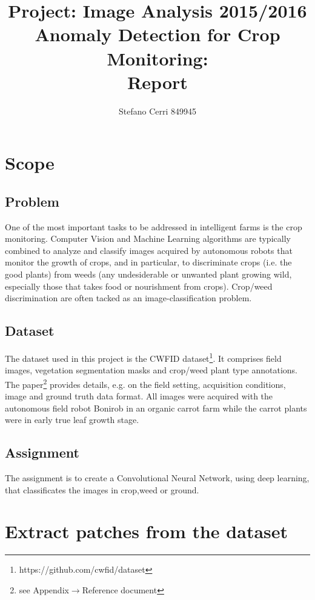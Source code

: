 \documentclass[]{report}
\title{Project: Image Analysis 2015/2016\\Anomaly Detection for Crop Monitoring:\\ Report}
\author{Stefano Cerri 849945}
\begin{document}
\maketitle
\tableofcontents
\listoffigures

\chapter{Scope}

\section{Problem}

One of the most important tasks to be addressed in intelligent farms is the crop monitoring. Computer Vision and Machine Learning algorithms are typically combined to analyze and classify images acquired by autonomous robots that monitor the growth of crops, and in particular, to discriminate crops (i.e. the good plants) from weeds (any undesiderable or unwanted plant growing wild, especially those that takes food or nourishment from crops). Crop/weed discrimination are often tacked as an image-classification problem.


\section{Dataset}

The dataset used in this project is the CWFID dataset\footnote{https://github.com/cwfid/dataset}. It comprises field images, vegetation segmentation masks and crop/weed plant type annotations. The paper\footnote{see Appendix$\rightarrow  $Reference document} provides details, e.g. on the field setting, acquisition conditions, image and ground truth data format.
All images were acquired with the autonomous field robot Bonirob in an organic carrot farm while the carrot plants were in early true leaf growth stage.

\section{Assignment}

The assignment is to create a Convolutional Neural Network, using deep learning, that classificates the images in crop,weed or ground. 

\chapter{Extract patches from the dataset}
\end{document}
